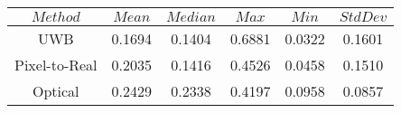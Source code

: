 \begin{table}[h]
\centering
\begin{tabular}{|c|c|c|c|c|c|}
\hline
$Method$ & $Mean$ & $Median$ & $Max$ & $Min$ & $StdDev$ \\
\hline
UWB & 0.1694 & 0.1404 & 0.6881 & 0.0322 & 0.1601 \\
\hline
Pixel-to-Real & 0.2035 & 0.1416 & 0.4526 & 0.0458 & 0.1510 \\
\hline
Optical & 0.2429 & 0.2338 & 0.4197 & 0.0958 & 0.0857 \\
\hline
\end{tabular}
\end{table}
